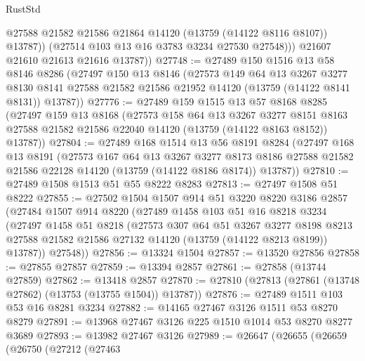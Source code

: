 \begin{lexlean}{RustStd}
\begin{coremodule}
                @27588
                @21582
                @21586
                @21864
                @14120
                (@13759 (@14122 @8116 @8107))
                @13787))
            (@27514 @103 @13 @16 @3783 @3234 @27530 @27548)))
        @21607
        @21610
        @21613
        @21616
        @13787))
@27748 := @27489
    @150
    @1516
    @13
    @58
    @8146
    @8286
    (@27497
      @150
      @13
      @8146
      (@27573
        @149
        @64
        @13
        @3267
        @3277
        @8130
        @8141
        @27588
        @21582
        @21586
        @21952
        @14120
        (@13759 (@14122 @8141 @8131))
        @13787))
@27776 := @27489
    @159
    @1515
    @13
    @57
    @8168
    @8285
    (@27497
      @159
      @13
      @8168
      (@27573
        @158
        @64
        @13
        @3267
        @3277
        @8151
        @8163
        @27588
        @21582
        @21586
        @22040
        @14120
        (@13759 (@14122 @8163 @8152))
        @13787))
@27804 := @27489
    @168
    @1514
    @13
    @56
    @8191
    @8284
    (@27497
      @168
      @13
      @8191
      (@27573
        @167
        @64
        @13
        @3267
        @3277
        @8173
        @8186
        @27588
        @21582
        @21586
        @22128
        @14120
        (@13759 (@14122 @8186 @8174))
        @13787))
@27810 := @27489 @1508 @1513 @51 @55 @8222 @8283
@27813 := @27497 @1508 @51 @8222
@27855 := @27502
    @1504
    @1507
    @914
    @51
    @3220
    @8220
    @3186
    @2857
    (@27484
      @1507
      @914
      @8220
      (@27489
        @1458
        @103
        @51
        @16
        @8218
        @3234
        (@27497
          @1458
          @51
          @8218
          (@27573
            @307
            @64
            @51
            @3267
            @3277
            @8198
            @8213
            @27588
            @21582
            @21586
            @27132
            @14120
            (@13759 (@14122 @8213 @8199))
            @13787))
        @27548))
@27856 := @13324 @1504
@27857 := @13520 @27856
@27858 := @27855 @27857
@27859 := @13394 @2857
@27861 := @27858 (@13744 @27859)
@27862 := @13418 @2857
@27870 := @27810 (@27813 (@27861 (@13748 @27862) (@13753 (@13755 @1504)) @13787))
@27876 := @27489 @1511 @103 @53 @16 @8281 @3234
@27882 := @14165 @27467 @3126 @1511 @53 @8270 @8279
@27891 := @13968 @27467 @3126 @225 @1510 @1014 @53 @8270 @8277 @3689
@27893 := @13982 @27467 @3126
@27989 := @26647
    (@26655
      (@26659
        (@26750
          (@27212
            (@27463

\end{coremodule}
\end{lexlean}
